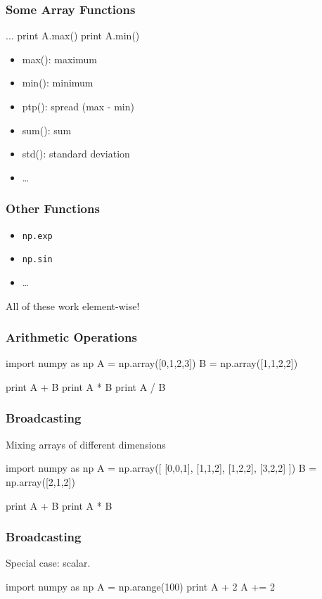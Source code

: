 \begin{frame}[fragile]
\frametitle{Some Array Functions}
\begin{python}
...
print A.max()
print A.min()
\end{python}

\begin{itemize}
\item max(): maximum
\item min(): minimum
\item ptp(): spread (max - min)
\item sum(): sum
\item std(): standard deviation
\item \ldots
\end{itemize}

\end{frame}

\begin{frame}[fragile]
\frametitle{Other Functions}
\begin{itemize}
\item \lstinline{np.exp}
\item \lstinline{np.sin}
\item \ldots
\end{itemize}

All of these work \alert{element-wise}!
\end{frame}

\begin{frame}[fragile]
\frametitle{Arithmetic Operations}
\begin{python}
import numpy as np
A = np.array([0,1,2,3])
B = np.array([1,1,2,2])

print A + B
print A * B
print A / B
\end{python}

\end{frame}

\begin{frame}[fragile]
\frametitle{Broadcasting}
Mixing arrays of different dimensions

\begin{python}
import numpy as np
A = np.array([
    [0,0,1],
    [1,1,2],
    [1,2,2],
    [3,2,2]
    ])
B = np.array([2,1,2])

print A + B
print A * B
\end{python}
\end{frame}

\begin{frame}[fragile]
\frametitle{Broadcasting}
Special case: scalar.

\begin{python}
import numpy as np
A = np.arange(100)
print A + 2
A += 2
\end{python}
\end{frame}

